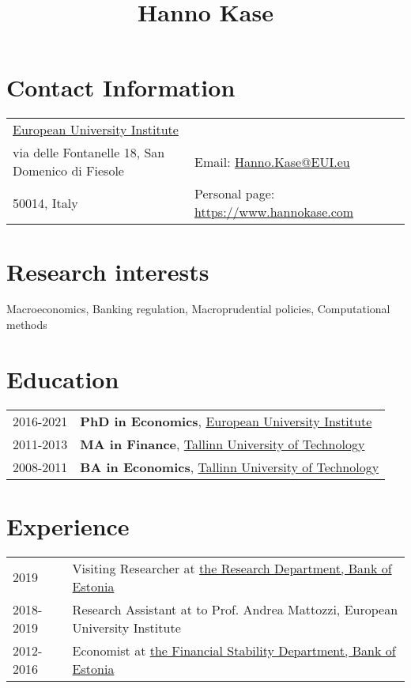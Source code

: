 \documentclass[a4, 11pt]{article}
\title{ {\Huge  Hanno Kase} }
\date{}
\begin{document}
    \maketitle


    \section*{Contact Information}
    \begin{table}[H]
      \begin{tabular}{ll}\href{https://www.eui.eu/}{European University Institute}&\\
        via delle Fontanelle 18, San Domenico di Fiesole&
        Email: \href{mailto:Hanno.Kase@EUI.eu}{Hanno.Kase@EUI.eu} \\
        50014, Italy& Personal page: \href{https://www.hannokase.com}{https://www.hannokase.com}
      \end{tabular}
    \end{table}

    \section*{Research interests}Macroeconomics, Banking regulation, Macroprudential policies, Computational methods

    \section*{Education}\begin{table}[H]
        \begin{tabular}{p{2cm}p{14cm}}
            2016-2021 & \textbf{PhD in Economics}, \href{https://www.eui.eu}{European University Institute}\\
            2011-2013 & \textbf{MA in Finance}, \href{https://www.ttu.ee/en}{Tallinn University of Technology}\\
            2008-2011 & \textbf{BA in Economics}, \href{https://www.ttu.ee/en}{Tallinn University of Technology}\\
        \end{tabular}
      \end{table}

    \section*{Experience}
  \begin{table}[H]
      \begin{tabular}{p{2cm}p{14cm}}
          2019 & Visiting Researcher at \href{https://www.eestipank.ee/en}{the Research Department, Bank of Estonia} \\
          2018-2019 & Research Assistant at {to Prof. Andrea Mattozzi, European University Institute} \\
          2012-2016 & Economist at \href{https://www.eestipank.ee/en}{the Financial Stability Department, Bank of Estonia} \\
      \end{tabular}
    \end{table}
\end{document}
